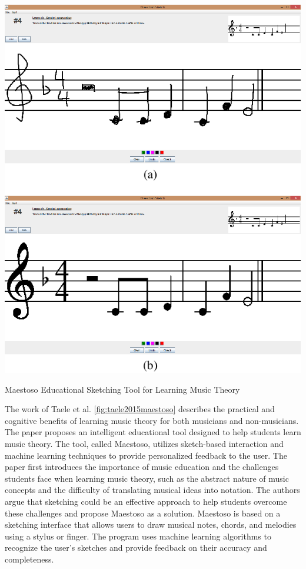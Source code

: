\begin{marginfigure}
    \centering
    \includegraphics{images/maestoso.png}
    \caption{Maestoso Educational
    Sketching Tool for Learning Music Theory}
    \label{fig:taele2015maestoso}
\end{marginfigure}

The work of Taele et al. \cite{taele2015maestoso} \ref{fig:taele2015maestoso} describes the practical and cognitive benefits of learning music theory for both musicians and non-musicians. The paper proposes an intelligent educational tool designed to help students learn music theory. The tool, called Maestoso, utilizes sketch-based interaction and machine learning techniques to provide personalized feedback to the user.
The paper first introduces the importance of music education and the challenges students face when learning music theory, such as the abstract nature of music concepts and the difficulty of translating musical ideas into notation. The authors argue that sketching could be an effective approach to help students overcome these challenges and propose Maestoso as a solution.
Maestoso is based on a sketching interface that allows users to draw musical notes, chords, and melodies using a stylus or finger. The program uses machine learning algorithms to recognize the user's sketches and provide feedback on their accuracy and completeness.

